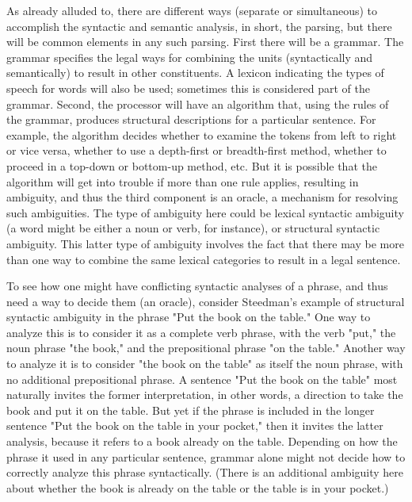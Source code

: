 As already alluded to, there are different ways (separate or simultaneous) to accomplish the syntactic and semantic analysis, in short, the parsing, but there will be common elements in any such parsing. First there will be a grammar. The grammar specifies the legal ways for combining the units (syntactically and semantically) to result in other constituents. A lexicon indicating the types of speech for words will also be used; sometimes this is considered part of the grammar. Second, the processor will have an algorithm that, using the rules of the grammar, produces structural descriptions for a particular sentence. For example, the algorithm decides whether to examine the tokens from left to right or vice versa, whether to use a depth-first or breadth-first method, whether to proceed in a top-down or bottom-up method, etc. But it is possible that the algorithm will get into trouble if more than one rule applies, resulting in ambiguity, and thus the third component is an oracle, a mechanism for resolving such ambiguities. The type of ambiguity here could be lexical syntactic ambiguity (a word might be either a noun or verb, for instance), or structural syntactic ambiguity. This latter type of ambiguity involves the fact that there may be more than one way to combine the same lexical categories to result in a legal sentence.

To see how one might have conflicting syntactic analyses of a phrase, and thus need a way to decide them (an oracle), consider Steedman's example of structural syntactic ambiguity in the phrase "Put the book on the table." One way to analyze this is to consider it as a complete verb phrase, with the verb "put," the noun phrase "the book," and the prepositional phrase "on the table." Another way to analyze it is to consider "the book on the table" as itself the noun phrase, with no additional prepositional phrase. A sentence "Put the book on the table" most naturally invites the former interpretation, in other words, a direction to take the book and put it on the table. But yet if the phrase is included in the longer sentence "Put the book on the table in your pocket," then it invites the latter analysis, because it refers to a book already on the table. Depending on how the phrase it used in any particular sentence, grammar alone might not decide how to correctly analyze this phrase syntactically. (There is an additional ambiguity here about whether the book is already on the table or the table is in your pocket.)

